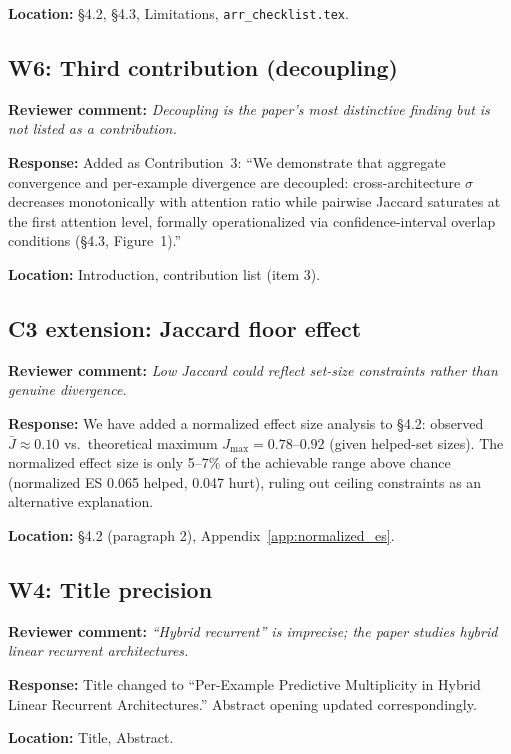 \documentclass[11pt]{article}
\newcommand{\reviewer}[1]{\textcolor{reviewercolor}{\textbf{Reviewer comment:} \textit{#1}}}
\newcommand{\response}[1]{\textcolor{responsecolor}{\textbf{Response:} #1}}
\newcommand{\location}[1]{\textbf{Location:} #1}
\begin{document}
\location{\S4.2, \S4.3, Limitations, \texttt{arr\_checklist.tex}.}

\subsection*{W6: Third contribution (decoupling)}

\reviewer{Decoupling is the paper's most distinctive finding but is not listed as a contribution.}

\response{Added as Contribution~3: ``We demonstrate that aggregate convergence and per-example divergence are decoupled: cross-architecture $\sigma$ decreases monotonically with attention ratio while pairwise Jaccard saturates at the first attention level, formally operationalized via confidence-interval overlap conditions (\S4.3, Figure~1).''}

\location{Introduction, contribution list (item 3).}

\subsection*{C3 extension: Jaccard floor effect}

\reviewer{Low Jaccard could reflect set-size constraints rather than genuine divergence.}

\response{We have added a normalized effect size analysis to \S4.2: observed $\bar{J} \approx 0.10$ vs.\ theoretical maximum $J_{\max} = 0.78$--$0.92$ (given helped-set sizes). The normalized effect size is only 5--7\% of the achievable range above chance (normalized ES 0.065 helped, 0.047 hurt), ruling out ceiling constraints as an alternative explanation.}

\location{\S4.2 (paragraph 2), Appendix~\ref{app:normalized_es}.}

\subsection*{W4: Title precision}

\reviewer{``Hybrid recurrent'' is imprecise; the paper studies hybrid \emph{linear} recurrent architectures.}

\response{Title changed to ``Per-Example Predictive Multiplicity in Hybrid Linear Recurrent Architectures.'' Abstract opening updated correspondingly.}

\location{Title, Abstract.}
\end{document}
